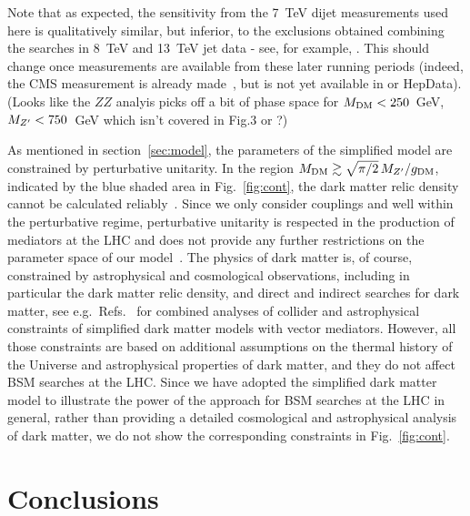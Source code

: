 \documentclass[floatfix]{article}
\begin{document}
Note that as expected, the sensitivity from the 7~TeV dijet measurements used here is qualitatively similar, but inferior, to the exclusions obtained 
combining the searches in 8~TeV and 13~TeV jet data - see, for example, \cite{Fairbairn:2016iuf}. This should change once measurements
are available from these later running periods (indeed, the CMS measurement is already made~\cite{Khachatryan:2016wdh}, but is not yet available in \rivet or HepData).
(Looks like the $ZZ$ analyis picks off a bit of phase space for $M_{\rm DM} < 250$~GeV, $M_{Z^{\prime}} < 750$~GeV which isn't covered in Fig.3 or \cite{Fairbairn:2016iuf}?) 

As mentioned in section~\ref{sec:model},  the parameters of the simplified model are constrained by perturbative unitarity. 
In the region $M_{\rm DM} \gtrsim \sqrt{\pi/2}\, M_{Z^{\prime}}/g_{\rm DM}$, indicated by the blue shaded area in Fig.~\ref{fig:cont}, 
the dark matter relic density cannot be calculated reliably~\cite{Kahlhoefer:2015bea}. Since we only consider couplings \GDM and \GQ well within the perturbative regime, perturbative unitarity is respected in the production of mediators at the LHC 
and does not provide any further restrictions on the parameter space of our model~\cite{Englert:2016joy}. The physics of dark matter is, of course, constrained by astrophysical and cosmological observations, including in particular the dark matter relic density, and direct and indirect searches for dark matter, see e.g.\ Refs.~\cite{Kahlhoefer:2015bea, Heisig:2015ira,Jacques:2016dqz} for combined analyses of collider and astrophysical constraints of simplified dark matter models with vector mediators. However, all those constraints are based on additional assumptions on the thermal history of the Universe and astrophysical properties of dark matter, and they do not affect BSM searches at the LHC. Since we have adopted the simplified dark matter model to illustrate the power of the \Contur approach for BSM searches at the LHC in general, rather than providing a detailed cosmological and astrophysical analysis of dark matter, we do not show the corresponding constraints in Fig.~\ref{fig:cont}.

\section{Conclusions}\label{sec:conclusions}
\end{document}
